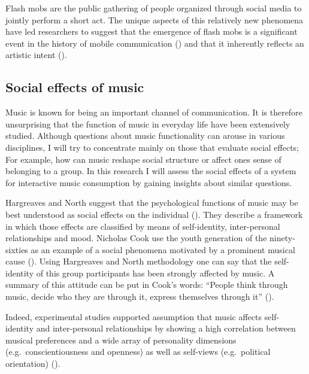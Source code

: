 \documentclass[a4paper,11pt]{article}
\begin{document}
Flash mobs are the public gathering of people organized through social media to jointly perform a short act.
The unique aspects of this relatively new phenomena have led researchers to suggest that the emergence of flash mobs is a significant event in the history of mobile communication (\cite{nicholson05}) and that it inherently reflects an artistic intent (\cite{brejzek10}).

\subsection{Social effects of music}

Music is known for being an important channel of communication.
It is therefore unsurprising that the function of music in everyday life have been extensively studied.
Although questions about music functionality can arouse in various disciplines, I will try to concentrate mainly on those that evaluate social effects;
For example, how can music reshape social structure or affect ones sense of belonging to a group.
In this research I will assess the social effects of a system for interactive music consumption by gaining insights about similar questions.

Hargreaves and North suggest that the psychological functions of music may be best understood as social effects on the individual (\cite*{hargreaves99}).
They describe a framework in which those effects are classified by means of self-identity, inter-personal relationships and mood.
Nicholas Cook use the youth generation of the ninety-sixties as an example of a social phenomena motivated by a prominent musical cause (\cite*[p. 5]{cook00}).
Using Hargreaves and North methodology one can say that the self-identity of this group participants has been strongly affected by music.
A summary of this attitude can be put in Cook's words: ``People think through music, decide who they are through it, express themselves through it'' (\cite*{cook00}).

Indeed, experimental studies supported assumption that music affects self-identity and inter-personal relationships by showing a high correlation between musical preferences and a wide array of personality dimensions (e.g.\ conscientiousness and openness) as well as self-views (e.g.\ political orientation) (\cite{rentfrow03}).
\end{document}
